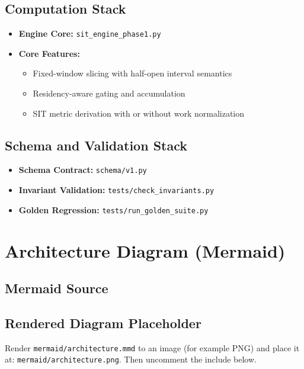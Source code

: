 \documentclass[11pt,a4paper]{article}
\begin{document}
\subsection{Computation Stack}
\begin{itemize}[leftmargin=1.4em]
  \item \textbf{Engine Core:} \texttt{sit\_engine\_phase1.py}
  \item \textbf{Core Features:}
  \begin{itemize}
    \item Fixed-window slicing with half-open interval semantics
    \item Residency-aware gating and accumulation
    \item SIT metric derivation with or without work normalization
  \end{itemize}
\end{itemize}

\subsection{Schema and Validation Stack}
\begin{itemize}[leftmargin=1.4em]
  \item \textbf{Schema Contract:} \texttt{schema/v1.py}
  \item \textbf{Invariant Validation:} \texttt{tests/check\_invariants.py}
  \item \textbf{Golden Regression:} \texttt{tests/run\_golden\_suite.py}
\end{itemize}

\section{Architecture Diagram (Mermaid)}
\subsection{Mermaid Source}


\subsection{Rendered Diagram Placeholder}
Render \texttt{mermaid/architecture.mmd} to an image (for example PNG) and place it at:
\texttt{mermaid/architecture.png}. Then uncomment the include below.

\end{document}
